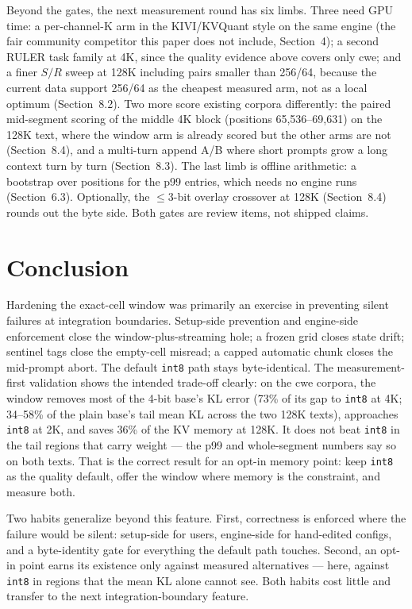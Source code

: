 \documentclass[10pt,twocolumn]{article}
\begin{document}
Beyond the gates, the next measurement round has six limbs. Three need GPU time: a per-channel-K arm in the KIVI/KVQuant style on the same engine (the fair community competitor this paper does not include, Section~4); a second RULER task family at 4K, since the quality evidence above covers only cwe; and a finer $S/R$ sweep at 128K including pairs smaller than 256/64, because the current data support 256/64 as the cheapest measured arm, not as a local optimum (Section~8.2). Two more score existing corpora differently: the paired mid-segment scoring of the middle 4K block (positions 65,536--69,631) on the 128K text, where the window arm is already scored but the other arms are not (Section~8.4), and a multi-turn append A/B where short prompts grow a long context turn by turn (Section~8.3). The last limb is offline arithmetic: a bootstrap over positions for the p99 entries, which needs no engine runs (Section~6.3). Optionally, the $\leq$3-bit overlay crossover at 128K (Section~8.4) rounds out the byte side. Both gates are review items, not shipped claims.

\section{Conclusion}

Hardening the exact-cell window was primarily an exercise in preventing silent failures at integration boundaries. Setup-side prevention and engine-side enforcement close the window-plus-streaming hole; a frozen grid closes state drift; sentinel tags close the empty-cell misread; a capped automatic chunk closes the mid-prompt abort. The default \texttt{int8} path stays byte-identical. The measurement-first validation shows the intended trade-off clearly: on the cwe corpora, the window removes most of the 4-bit base's KL error (73\% of its gap to \texttt{int8} at 4K; 34--58\% of the plain base's tail mean KL across the two 128K texts), approaches \texttt{int8} at 2K, and saves 36\% of the KV memory at 128K. It does not beat \texttt{int8} in the tail regions that carry weight --- the p99 and whole-segment numbers say so on both texts. That is the correct result for an opt-in memory point: keep \texttt{int8} as the quality default, offer the window where memory is the constraint, and measure both.

Two habits generalize beyond this feature. First, correctness is enforced where the failure would be silent: setup-side for users, engine-side for hand-edited configs, and a byte-identity gate for everything the default path touches. Second, an opt-in point earns its existence only against measured alternatives --- here, against \texttt{int8} in regions that the mean KL alone cannot see. Both habits cost little and transfer to the next integration-boundary feature.
\end{document}
